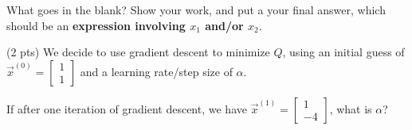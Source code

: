 \documentclass[twoside,12pt]{article}
\begin{document}
\begin{probset}
\begin{prob}[(5 pts)]
\begin{subprobset}
\begin{subprob}
What goes in the blank? Show your work, and put a  your final answer, which should be an \textbf{expression involving $x_1$ and/or $x_2$}.

\begin{responsebox}{2in}
    
\end{responsebox}

\end{subprob}

\begin{subprob}(2 pts) We decide to use gradient descent to minimize $Q$, using an initial guess of $\vec x^{(0)} = \begin{bmatrix} 1 \\ 1 \end{bmatrix}$ and a learning rate/step size of $\alpha$.

If after one iteration of gradient descent, we have $\vec{x}^{(1)} = \begin{bmatrix} 1 \\ -4 \end{bmatrix}$, what is $\alpha$?

\vspace{0.1in}







\end{subprob}

\end{subprobset}

\end{prob}

\newpage





    

\end{probset}
\end{document}

